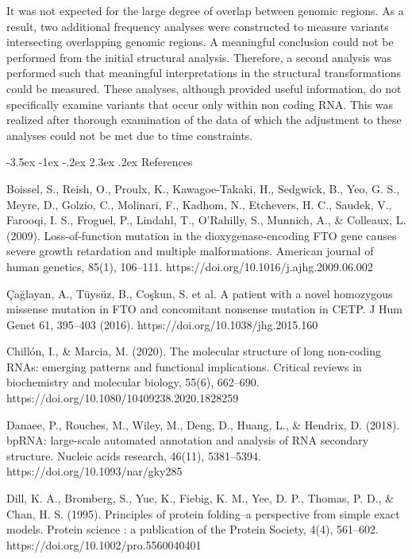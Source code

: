 \documentclass[11pt]{article}
\makeatletter
\renewcommand\section{\@startsection {section}{1}{\z@}%
                                       {-3.5ex \@plus -1ex \@minus -.2ex}%
                                       {2.3ex \@plus.2ex}%
                                       {\normalfont\fontfamily{phv}\fontsize{16}{19}\bfseries}}
\makeatother
\begin{document}
It was not expected for the large degree of overlap between genomic regions. As a result, two additional frequency analyses were constructed to measure variants intersecting overlapping genomic regions. A meaningful conclusion could not be performed from the initial structural analysis. Therefore, a second analysis was performed such that meaningful interpretations in the structural transformations could be measured. These analyses, although provided useful information, do not specifically examine variants that occur only within non coding RNA. This was realized after thorough examination of the data of which the adjustment to these analyses could not be met due to time constraints. 

\section{References} \label{s:references}

Boissel, S., Reish, O., Proulx, K., Kawagoe-Takaki, H., Sedgwick, B., Yeo, G. S., Meyre, D., Golzio, C., Molinari, F., Kadhom, N., Etchevers, H. C., Saudek, V., Farooqi, I. S., Froguel, P., Lindahl, T., O'Rahilly, S., Munnich, A., & Colleaux, L. (2009). Loss-of-function mutation in the dioxygenase-encoding FTO gene causes severe growth retardation and multiple malformations. American journal of human genetics, 85(1), 106–111. https://doi.org/10.1016/j.ajhg.2009.06.002 

Çağlayan, A., Tüysüz, B., Coşkun, S. et al. A patient with a novel homozygous missense mutation in FTO and concomitant nonsense mutation in CETP. J Hum Genet 61, 395–403 (2016). https://doi.org/10.1038/jhg.2015.160 

Chillón, I., & Marcia, M. (2020). The molecular structure of long non-coding RNAs: emerging patterns and functional implications. Critical reviews in biochemistry and molecular biology, 55(6), 662–690. https://doi.org/10.1080/10409238.2020.1828259 

Danaee, P., Rouches, M., Wiley, M., Deng, D., Huang, L., & Hendrix, D. (2018). bpRNA: large-scale automated annotation and analysis of RNA secondary structure. Nucleic acids research, 46(11), 5381–5394. https://doi.org/10.1093/nar/gky285 

Dill, K. A., Bromberg, S., Yue, K., Fiebig, K. M., Yee, D. P., Thomas, P. D., & Chan, H. S. (1995). Principles of protein folding--a perspective from simple exact models. Protein science : a publication of the Protein Society, 4(4), 561–602. https://doi.org/10.1002/pro.5560040401 
\end{document}
